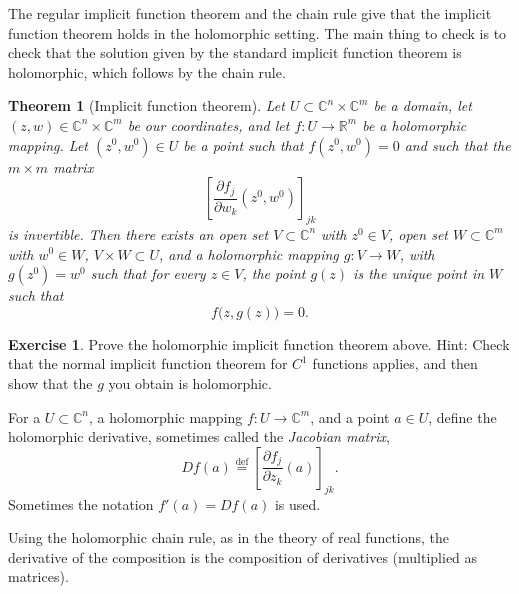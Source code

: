 \documentclass[12pt,openany]{book}
\newcommand{\C}{{\mathbb{C}}}
\newcommand{\R}{{\mathbb{R}}}
\newcommand{\myindex}[1]{#1\index{#1}}
\theoremstyle{plain}
\newtheorem{thm}{Theorem}[section]
\theoremstyle{remark}
\theoremstyle{definition}
\newenvironment{exbox}{%
    \def\FrameCommand{\vrule width 1pt \relax\hspace {10pt}}%
    \MakeFramed {\advance \hsize -\width \FrameRestore }%
}{%
    \endMakeFramed
}
\theoremstyle{exercise}
\newtheorem{exercise}{Exercise}[section]
\theoremstyle{example}
\begin{document}
The regular implicit function theorem and the chain rule
give that the implicit function theorem holds in the holomorphic setting.
The main thing to check is to check that the solution given by the
standard implicit function theorem is holomorphic, which follows by the
chain rule.

\begin{thm}[Implicit function theorem] \label{thm:ift}
Let $U \subset \C^{n} \times \C^{m}$ be a domain, let  $(z,w) \in \C^n \times
\C^m$ be our coordinates, and let $f \colon U \to \R^m$
be a holomorphic mapping.  Let $(z^0,w^0) \in U$ be a point such that
$f(z^0,w^0) = 0$ and such that the $m \times m$ matrix
\begin{equation*}
\left[
\frac{\partial f_j}{\partial w_k} (z^0,w^0)
\right]_{jk}
\end{equation*}
is invertible.
Then there exists an
open set $V \subset \C^n$ with $z^0 \in V$,
open set $W \subset \C^m$ with $w^0 \in W$,
$V \times W \subset U$,
and
a holomorphic
mapping $g \colon V \to W$, with $g(z^0) = w^0$
such that
for every $z \in V$, the point $g(z)$ is the unique point in $W$
such that
\begin{equation*}
f\bigl(z,g(z)\bigr) = 0 .
\end{equation*}
\end{thm}

\begin{exbox}
\begin{exercise}
Prove the holomorphic implicit function theorem above.
Hint: Check that the normal implicit function theorem for $C^1$
functions applies, and then show that the $g$ you obtain is holomorphic.
\end{exercise}
\end{exbox}

For a $U \subset \C^n$, a holomorphic mapping $f \colon U \to \C^m$,
and a point $a \in U$,
define the holomorphic derivative, sometimes called the
\emph{\myindex{Jacobian matrix}},
%
\begin{equation*}
Df(a)
\overset{\text{def}}{=}
\left[
\frac{\partial f_j}{\partial z_k} (a)
\right]_{jk} .
\end{equation*}
Sometimes the notation $f'(a) = Df(a)$ is used.

Using the holomorphic chain rule, as in the theory of real functions,
the derivative of the composition is the composition of derivatives
(multiplied as matrices).
\end{document}
